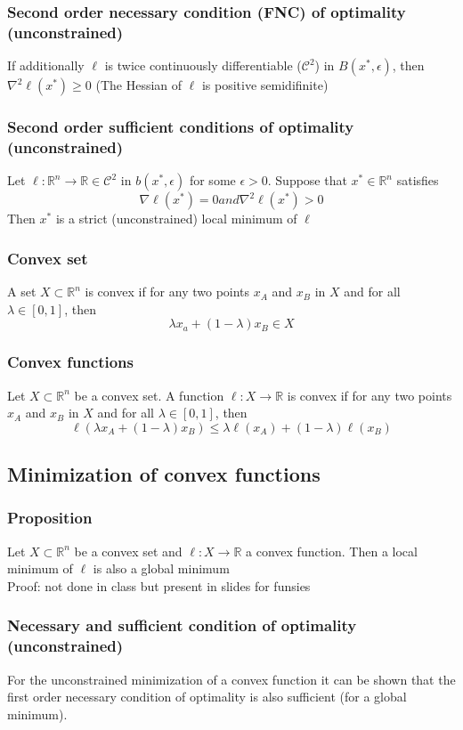 \documentclass{book}
\newcommand{\R}{\mathbb{R}}
\theoremstyle{definition}
\theoremstyle{remark}
\theoremstyle{remark}
\begin{document}
\subsubsection{Second order necessary condition (FNC) of optimality (unconstrained)}
If additionally $\ell$ is twice continuously differentiable ($\mathcal{C}^2$) in $B(x^*,\epsilon)$, then $\nabla^2 \ell(x^*)\geq 0$ (The Hessian of $\ell$ is positive semidifinite)
\subsubsection{Second order sufficient conditions of optimality (unconstrained)}
Let $\ell:\R^n\to\R\in\mathcal{C}^2$ in $b(x^*,\epsilon)$ for some $\epsilon>0$. Suppose that $x^*\in\R^n$ satisfies 
\[
    \nabla\ell(x^*) = 0 and \nabla^2\ell(x^*)>0
\]
Then $x^*$ is a strict (unconstrained) local minimum of $\ell$
\subsubsection{Convex set} 
A set $X\subset \R^n$ is convex if for any two points $x_A$ and $x_B$ in $X$ and for all $\lambda\in[0,1]$, then 
\[
    \lambda x_a+(1-\lambda)x_B \in X
\]
\subsubsection{Convex functions}
Let $X \subset \R^n$ be a convex set. A function $\ell:X\to\R$ is convex if for any two points $x_A$ and $x_B$ in $X$ and for all $\lambda\in[0,1]$, then 
\[
    \ell(\lambda x_A + (1-\lambda)x_B)\leq \lambda\ell(x_A)+ (1-\lambda)\ell(x_B)
\]
\subsection{Minimization of convex functions}
\subsubsection{Proposition}
Let $X\subset\R^n$ be a convex set and $\ell: X\to\R$ a convex function. Then a local minimum of $\ell$ is also a global minimum \\
Proof: not done in class but present in slides for funsies
\subsubsection{Necessary and sufficient condition of optimality (unconstrained)}
For the unconstrained minimization of a convex function it can be shown that the first order necessary condition of optimality is also sufficient (for a global minimum).
\end{document}
